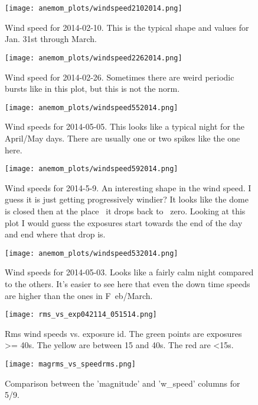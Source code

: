 \documentclass{article}
\begin{document}
\begin{figure}[h!]
  \centering
  \texttt{[image: anemom\_plots/windspeed2102014.png]}
  \caption{Wind speed for 2014-02-10. This is the typical shape and values for Jan. 31st through March.}
\end{figure}

\begin{figure}[h!]
  \centering
  \texttt{[image: anemom\_plots/windspeed2262014.png]}
  \caption{Wind speed for 2014-02-26. Sometimes there are weird periodic bursts like in this plot, but this is not the norm.}
\end{figure}

\begin{figure}[h!]
  \centering
  \texttt{[image: anemom\_plots/windspeed552014.png]}
  \caption{Wind speeds for 2014-05-05. This looks like a typical night for the April/May days. There are usually one or two spikes like the one here.}
\end{figure}

\begin{figure}[h!]
  \centering
  \texttt{[image: anemom\_plots/windspeed592014.png]}
  \caption{Wind speeds for 2014-5-9. An interesting shape in the wind speed. I guess it is just getting progressively windier? It looks like the dome is closed then at the place \
it drops back to ~zero. Looking at this plot I would guess the exposures start towards the end of the day and end where that drop is.}
\end{figure}

\begin{figure}[h!]
  \centering
  \texttt{[image: anemom\_plots/windspeed532014.png]}
  \caption{Wind speeds for 2014-05-03. Looks like a fairly calm night compared to the others. It's easier to see here that even the down time speeds are higher than the ones in F\
eb/March.}
\end{figure}

\begin{figure}[h!]
  \centering
  \texttt{[image: rms\_vs\_exp042114\_051514.png]}
  \caption{Rms wind speeds vs. exposure id. The green points are exposures >= 40s. The yellow are between 15 and 40s. The red are <15s. }
\end{figure}

\begin{figure}[h!]
  \centering
  \texttt{[image: magrms\_vs\_speedrms.png]}
  \caption{Comparison between the 'magnitude' and 'w_speed' columns for 5/9.}
\end{figure}
\end{document}
